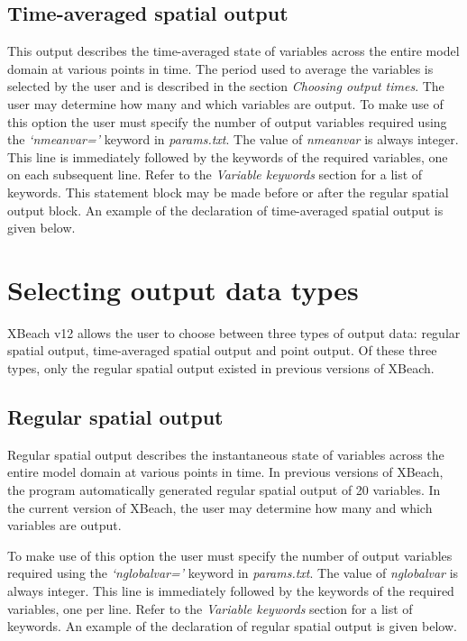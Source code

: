\subsection{ Time-averaged spatial output}

This output describes the time-averaged state of variables across the entire model domain at various points in time. The period used to average the variables is selected by the user and is described in the section \textit{Choosing output times}. The user may determine how many and which variables are output. To make use of this option the user must specify the number of output variables required using the \textit{`nmeanvar='} keyword in \textit{params.txt}. The value of \textit{nmeanvar} is always integer. This line is immediately followed by the keywords of the required variables, one on each subsequent line. Refer to the \textit{Variable keywords} section for a list of keywords. This statement block may be made before or after the regular spatial output block. An example of the declaration of time-averaged spatial output is given below.


\section{Selecting output data types}

XBeach v12 allows the user to choose between three types of output data: regular spatial output, time-averaged spatial output and point output. Of these three types, only the regular spatial output existed in previous versions of XBeach.
\subsection{ Regular spatial output}

Regular spatial output describes the instantaneous state of variables across the entire model domain at various points in time. In previous versions of XBeach, the program automatically generated regular spatial output of 20 variables. In the current version of XBeach, the user may determine how many and which variables are output. 

To make use of this option the user must specify the number of output variables required using the \textit{`nglobalvar='} keyword in \textit{params.txt}. The value of \textit{nglobalvar} is always integer. This line is immediately followed by the keywords of the required variables, one per line. Refer to the \textit{Variable keywords} section for a list of keywords. An example of the declaration of regular spatial output is given below.

